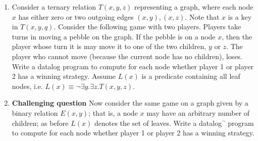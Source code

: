 \documentclass[12pt]{article}
\begin{document}
\begin{enumerate}
\item Consider a ternary relation $T(x,y, z)$ representing a graph,
  where each node $x$ has either zero or two outgoing edges $(x,y),
  (x,z)$.  Note that $x$ is a key in $T(x,y,q)$.  Consider the
  following game with two players.  Players take turns in moving a
  pebble on the graph.  If the pebble is on a node $x$, then the
  player whose turn it is may move it to one of the two children, $y$
  or $z$.  The player who cannot move (because the current node has no
  children), loses.  Write a datalog program to compute for each node
  whether player 1 or player 2 has a winning strategy.  Assume $L(x)$
  is a predicate containing all leaf nodes, i.e. $L(x) \equiv \neg
  \exists y.\exists z.T(x,y,z)$.
\item {\bf Challenging question} Now consider the same game on a graph
  given by a binary relation $E(x,y)$; that is, a node $x$ may have an
  arbitrary number of children; as before $L(x)$ denotes the set of
  leaves.  Write a datalog$^\neg$ program to compute for each node
  whether player 1 or player 2 has a winning strategy.
% 
% 
% 


\end{enumerate}
\end{document}

